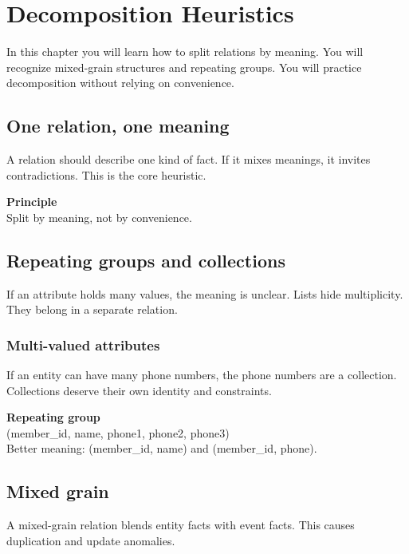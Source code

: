 \chapter{Decomposition Heuristics}

\begin{learningobjectives}
In this chapter you will learn how to split relations by meaning.
You will recognize mixed-grain structures and repeating groups.
You will practice decomposition without relying on convenience.
\end{learningobjectives}

\section{One relation, one meaning}
A relation should describe one kind of fact.
If it mixes meanings, it invites contradictions.
This is the core heuristic.

\begin{principlebox}
\textbf{Principle}\\
Split by meaning, not by convenience.
\end{principlebox}

\section{Repeating groups and collections}
If an attribute holds many values, the meaning is unclear.
Lists hide multiplicity.
They belong in a separate relation.

\subsection{Multi-valued attributes}
If an entity can have many phone numbers, the phone numbers are a collection.
Collections deserve their own identity and constraints.

\begin{examplebox}
\textbf{Repeating group}\\
(member\_id, name, phone1, phone2, phone3)\\
Better meaning: (member\_id, name) and (member\_id, phone).
\end{examplebox}

\section{Mixed grain}
A mixed-grain relation blends entity facts with event facts.
This causes duplication and update anomalies.

